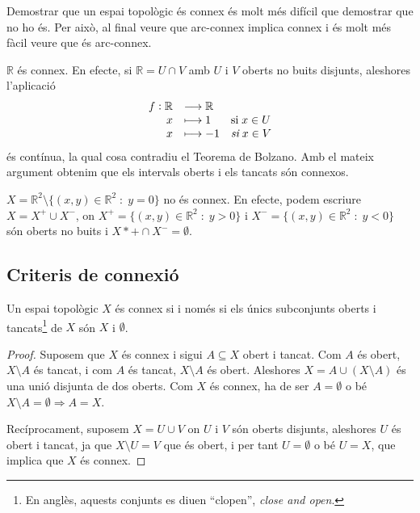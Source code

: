 \documentclass[../main.tex]{subfiles}
\begin{document}
Demostrar que un espai topològic és connex és molt més difícil que demostrar que no ho és. Per això, al final veure que arc-connex implica connex i és molt més fàcil veure que és arc-connex.

\begin{ej}
\label{ej:connex2} $\mathbb{R}$ és connex. En efecte, si $\mathbb{R} = U\cap V$ amb $U$ i $V$ oberts no buits disjunts, aleshores l'aplicació
\begin{equation}
    \notag
    \begin{array}{rll}
        f:\mathbb{R} & \longrightarrow\mathbb{R} & \\
        x & \longmapsto 1 & \text{si}\;x\in U \\
        x & \longmapsto -1 & \textit{si}\;x\in V
    \end{array}
\end{equation}
és contínua, la qual cosa contradiu el Teorema de Bolzano. Amb el mateix argument obtenim que els intervals oberts i els tancats són connexos.
\end{ej}

\begin{ej}
\label{ej:connex3} $X = \mathbb{R}^2\setminus\{(x,y)\in\mathbb{R}^2\;:\;y=0\}$ no és connex. En efecte, podem escriure $X = X^+\cup X^-$, on $X^+ = \{(x,y)\in\mathbb{R}^2\;:\;y>0\}$ i $X^- = \{(x,y)\in\mathbb{R}^2\;:\;y<0\}$ són oberts no buits i $X*+\cap X^-=\emptyset$.
\end{ej}

\subsection{Criteris de connexió}

\begin{prop}
\label{prop:criterideconnexio1} Un espai topològic $X$ és connex si i només si els únics subconjunts oberts i tancats\footnote{En anglès, aquests conjunts es diuen ``clopen'', \textit{close and open}.} de $X$ són $X$ i $\emptyset$.
\end{prop}
\begin{proof}
Suposem que $X$ és connex i sigui $A\subseteq X$ obert i tancat. Com $A$ és obert, $X\setminus A$ és tancat, i com $A$ és tancat, $X\setminus A$ és obert. Aleshores $X = A\cup(X\setminus A)$ és una unió disjunta de dos oberts. Com $X$ és connex, ha de ser $A = \emptyset$ o bé $X\setminus A = \emptyset\Rightarrow A = X$.

Recíprocament, suposem $X = U\cup V$ on $U$ i $V$ són oberts disjunts, aleshores $U$ és obert i tancat, ja que $X\setminus U = V$ que és obert, i per tant $U=\emptyset$ o bé $U = X$, que implica que $X$ és connex.  
\end{proof}
\end{document}
